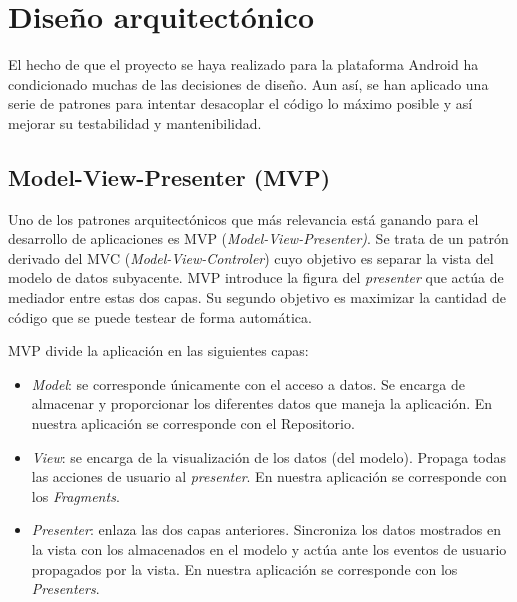 
\section{Diseño arquitectónico}\label{diseno-arquitectonico}

El hecho de que el proyecto se haya realizado para la plataforma Android
ha condicionado muchas de las decisiones de diseño. Aun así, se han
aplicado una serie de patrones para intentar desacoplar el código lo
máximo posible y así mejorar su testabilidad y mantenibilidad.

\subsection{Model-View-Presenter (MVP)}\label{model-view-presenter-mvp}

Uno de los patrones arquitectónicos que más relevancia está ganando para
el desarrollo de aplicaciones es MVP (\emph{Model-View-Presenter)}. Se
trata de un patrón derivado del MVC (\emph{Model-View-Controler}) cuyo
objetivo es separar la vista del modelo de datos subyacente. MVP
introduce la figura del \emph{presenter} que actúa de mediador entre
estas dos capas. Su segundo objetivo es maximizar la cantidad de código
que se puede testear de forma automática.

MVP divide la aplicación en las siguientes capas:\citep{pattern:mvp}

\begin{itemize}
\tightlist
\item
  \emph{Model}: se corresponde únicamente con el acceso a datos. Se
  encarga de almacenar y proporcionar los diferentes datos que maneja la
  aplicación. En nuestra aplicación se corresponde con el Repositorio.
\item
  \emph{View}: se encarga de la visualización de los datos (del modelo).
  Propaga todas las acciones de usuario al \emph{presenter}. En nuestra
  aplicación se corresponde con los \emph{Fragments}.
\item
  \emph{Presenter}: enlaza las dos capas anteriores. Sincroniza los
  datos mostrados en la vista con los almacenados en el modelo y actúa
  ante los eventos de usuario propagados por la vista. En nuestra
  aplicación se corresponde con los \emph{Presenters}.
\end{itemize}


